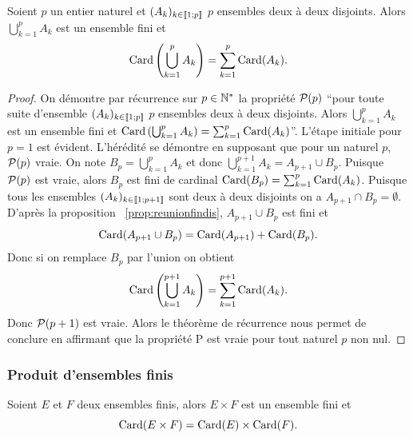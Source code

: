 \begin{prop}
  Soient \(p\) un entier naturel et \((A_k)_{k\in\intervalleentier{1}{p}}\) 
  \(p\) ensembles deux à deux disjoints. Alors \(\bigcup_{k = 1}^{p}A_k\) est un 
  ensemble fini et
  \begin{equation}
    \Card\left(\bigcup_{k = 1}^{p}A_k\right)=\sum_{k = 1}^{p}\Card(A_k).
  \end{equation}
\end{prop}

\begin{proof}
  On démontre par récurrence sur \(p\in \N^*\) la propriété \(\P(p)\) ``pour 
  toute suite d'ensemble \((A_k)_{k\in\intervalleentier{1}{p}}\) \(p\) ensembles 
  deux à deux disjoints. Alors \(\bigcup_{k = 1}^{p}A_k\) est un ensemble fini et 
  \(\Card\left(\bigcup_{k = 1}^{p}A_k\right)=\sum_{k = 1}^{p}\Card(A_k)\)''. L'étape 
  initiale pour \(p = 1\) est évident. L'hérédité se démontre en supposant que 
  pour un naturel \(p\), \(\P(p)\) vraie. On note \(B_p = \bigcup_{k = 1}^{p}A_k\) 
  et donc \(\bigcup_{k = 1}^{p + 1}A_k = A_{p + 1}\cup B_p\). Puisque \(\P(p)\) est 
  vraie, alors \(B_p\) est fini de cardinal 
  \(\Card(B_p)=\sum_{k = 1}^{p}\Card(A_k)\). Puisque tous les ensembles 
  \((A_k)_{k\in\intervalleentier{1}{p + 1}}\) sont deux à deux disjoints on a 
  \(A_{p + 1}\cap B_p = \emptyset\). D'après la proposition~
  \ref{prop:reunionfindis}, \(A_{p + 1}\cup B_p\) est fini et
  \begin{equation}
    \Card(A_{p + 1}\cup B_p) = \Card(A_{p + 1})+\Card(B_p).
  \end{equation}
  Donc si on remplace \(B_p\) par l'union on obtient
  \begin{equation}
    \Card\left(\bigcup_{k = 1}^{p + 1}A_k\right) = \sum_{k = 1}^{p + 1}\Card(A_k).
  \end{equation}
  Donc \(\P(p + 1)\) est vraie. Alors le théorème de récurrence nous permet de 
  conclure en affirmant que la propriété P est vraie pour tout naturel \(p\) non 
  nul.
\end{proof}

\subsubsection{Produit d'ensembles finis}

\begin{prop}
  \label{prop:produitfini}
  Soient \(E\) et \(F\) deux ensembles finis, alors \(E\times F\) est un 
  ensemble fini et
  \begin{equation}
    \Card(E\times F)=\Card(E)\times \Card(F).
  \end{equation}
\end{prop}

